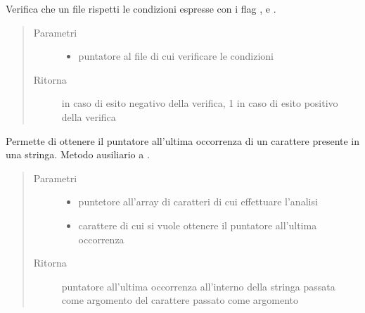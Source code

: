 \documentclass[letterpaper,10pt,italian,openany,oneside]{sphinxmanual}
\begin{document}

\begin{fulllineitems}
\label{\detokenize{documentazione:c.checkOptions}}
Verifica che un file rispetti le condizioni espresse con i flag ,  e .
\begin{quote}\begin{description}
\item[{Parametri}] \leavevmode\begin{itemize}
\item {} 
 \textendash{} puntatore al file di cui verificare le condizioni

\end{itemize}

\item[{Ritorna}]  in caso di esito negativo della verifica, 1 in caso di esito positivo della verifica

\end{description}\end{quote}

\end{fulllineitems}


\begin{fulllineitems}
\label{\detokenize{documentazione:c.findLastOf}}
Permette di ottenere il puntatore all’ultima occorrenza di un carattere presente in una stringa.
Metodo ausiliario a .
\begin{quote}\begin{description}
\item[{Parametri}] \leavevmode\begin{itemize}
\item {} 
 \textendash{} puntetore all’array di caratteri di cui effettuare l’analisi

\item {} 
 \textendash{} carattere di cui si vuole ottenere il puntatore all’ultima occorrenza

\end{itemize}

\item[{Ritorna}] \leavevmode
puntatore all’ultima occorrenza all’interno della stringa passata come argomento del carattere passato come argomento

\end{description}\end{quote}

\end{fulllineitems}
\end{document}
